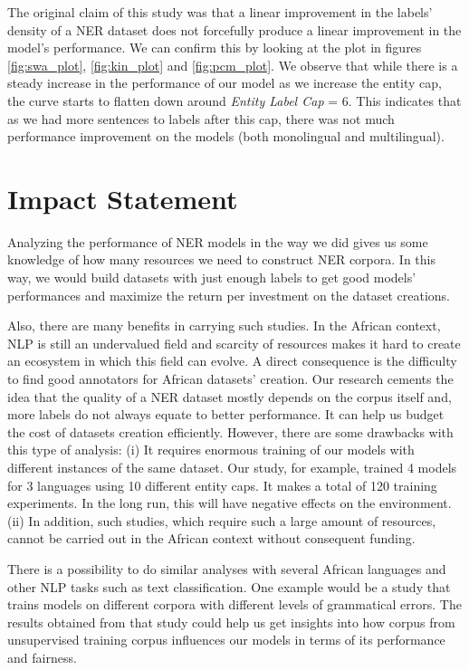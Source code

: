 \documentclass{article}
\begin{document}
The original claim of this study was that a linear improvement in the labels' density of a NER dataset does not forcefully produce a linear improvement in the model's performance. We can confirm this by looking at the plot in figures \ref{fig:swa_plot}, \ref{fig:kin_plot} and \ref{fig:pcm_plot}. We observe that while there is a steady increase in the performance of our model as we increase the entity cap, the curve starts to flatten down around \textit{Entity Label Cap} = 6. This indicates that as we had more sentences to labels after this cap, there was not much performance improvement on the models (both monolingual and multilingual).

\section{Impact Statement}
Analyzing the performance of NER models in the way we did gives us some knowledge of how many resources we need to construct NER corpora. In this way, we would build datasets with just enough labels to get good models' performances and maximize the return per investment on the dataset creations.

Also, there are many benefits in carrying such studies. In the African context, NLP is still an undervalued field and scarcity of resources makes it hard to create an ecosystem in which this field can evolve. A direct consequence is the difficulty to find good annotators for African datasets' creation. Our research cements the idea that the quality of a NER dataset mostly depends on the corpus itself and, more labels do not always equate to better performance. It can help us budget the cost of datasets creation efficiently. However, there are some drawbacks with this type of analysis: (i) It requires enormous training of our models with different instances of the same dataset. Our study, for example, trained 4 models for 3 languages using 10 different entity caps. It makes a total of 120 training experiments. In the long run, this will have negative effects on the environment. (ii) In addition, such studies, which require such a large amount of resources, cannot be carried out in the African context without consequent funding.

There is a possibility to do similar analyses with several African languages and other NLP tasks such as text classification. One example would be a study that trains models on different corpora with different levels of grammatical errors. The results obtained from that study could help us get insights into how corpus from unsupervised training corpus influences our models in terms of its performance and fairness.
\end{document}
